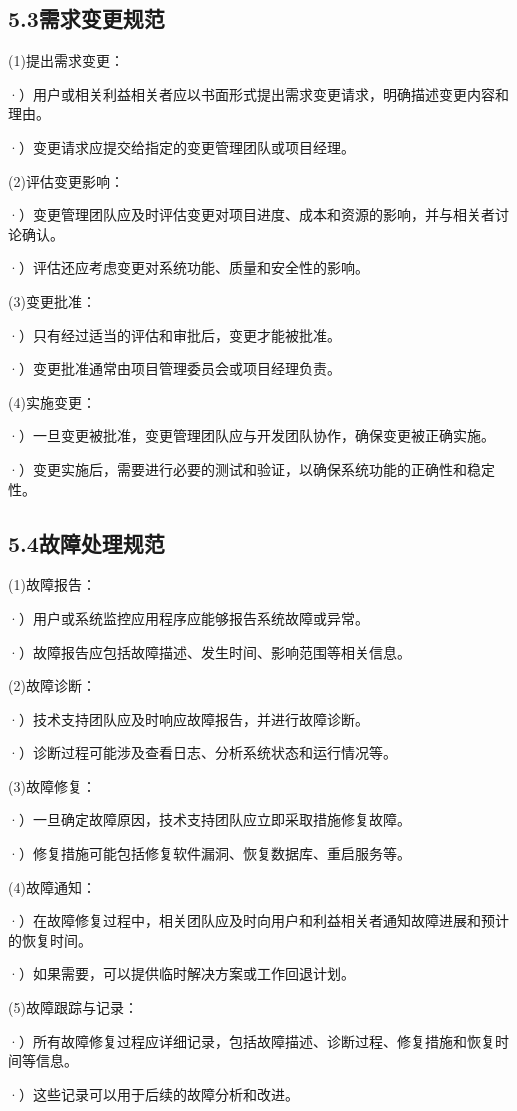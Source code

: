 \documentclass[24pt,a4paper]{article}%
\begin{document}
\subsection*{\songti 5.3需求变更规范}
\noindent (1)提出需求变更：\par
·）用户或相关利益相关者应以书面形式提出需求变更请求，明确描述变更内容和理由。\par
·）变更请求应提交给指定的变更管理团队或项目经理。\par
\noindent (2)评估变更影响：\par
·）变更管理团队应及时评估变更对项目进度、成本和资源的影响，并与相关者讨论确认。\par
·）评估还应考虑变更对系统功能、质量和安全性的影响。\par
\noindent (3)变更批准：\par
·）只有经过适当的评估和审批后，变更才能被批准。\par
·）变更批准通常由项目管理委员会或项目经理负责。\par
\noindent (4)实施变更：\par
·）一旦变更被批准，变更管理团队应与开发团队协作，确保变更被正确实施。\par
·）变更实施后，需要进行必要的测试和验证，以确保系统功能的正确性和稳定性。\par
\subsection*{\songti 5.4故障处理规范}
\noindent (1)故障报告：\par
·）用户或系统监控应用程序应能够报告系统故障或异常。\par
·）故障报告应包括故障描述、发生时间、影响范围等相关信息。\par
\noindent (2)故障诊断：\par
·）技术支持团队应及时响应故障报告，并进行故障诊断。\par
·）诊断过程可能涉及查看日志、分析系统状态和运行情况等。\par
\noindent (3)故障修复：\par
·）一旦确定故障原因，技术支持团队应立即采取措施修复故障。\par
·）修复措施可能包括修复软件漏洞、恢复数据库、重启服务等。\par
\noindent (4)故障通知：\par
·）在故障修复过程中，相关团队应及时向用户和利益相关者通知故障进展和预计的恢复时间。\par
·）如果需要，可以提供临时解决方案或工作回退计划。\par
\noindent (5)故障跟踪与记录：\par
·）所有故障修复过程应详细记录，包括故障描述、诊断过程、修复措施和恢复时间等信息。\par
·）这些记录可以用于后续的故障分析和改进。\par
\newpage
\end{document}
